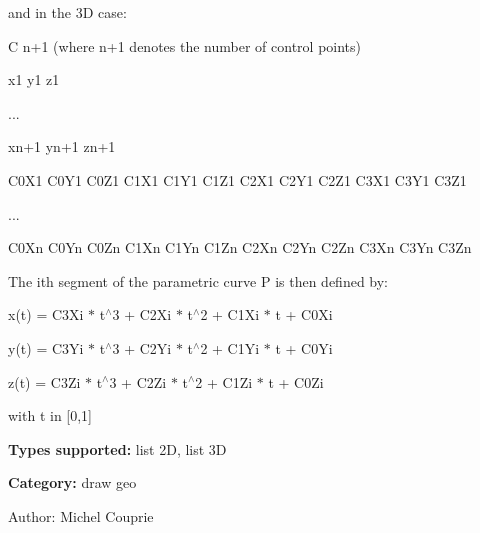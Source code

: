 and in the 3D case:

C n+1 (where n+1 denotes the number of control points)\par
 x1 y1 z1\par
 ...\par
 xn+1 yn+1 zn+1\par
 C0X1 C0Y1 C0Z1 C1X1 C1Y1 C1Z1 C2X1 C2Y1 C2Z1 C3X1 C3Y1 C3Z1\par
 ...\par
 C0Xn C0Yn C0Zn C1Xn C1Yn C1Zn C2Xn C2Yn C2Zn C3Xn C3Yn C3Zn\par


The ith segment of the parametric curve P is then defined by:

x(t) = C3Xi $\ast$ t$^\wedge$3 + C2Xi $\ast$ t$^\wedge$2 + C1Xi $\ast$ t + C0Xi\par
 y(t) = C3Yi $\ast$ t$^\wedge$3 + C2Yi $\ast$ t$^\wedge$2 + C1Yi $\ast$ t + C0Yi\par
 z(t) = C3Zi $\ast$ t$^\wedge$3 + C2Zi $\ast$ t$^\wedge$2 + C1Zi $\ast$ t + C0Zi\par
 with t in [0,1]

{\bf Types supported:} list 2D, list 3D

{\bf Category:} draw geo

\begin{Desc}
\item[Author:]Michel Couprie \end{Desc}
